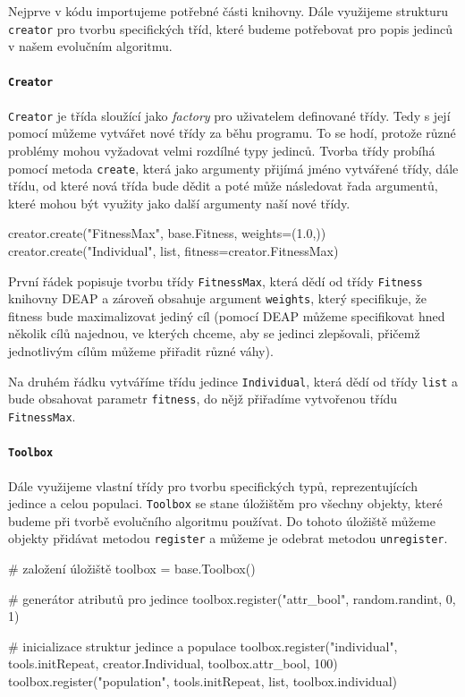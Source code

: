 Nejprve v kódu importujeme potřebné části knihovny. Dále využijeme strukturu
\texttt{creator} pro tvorbu specifických tříd, které budeme potřebovat pro
popis jedinců v našem evolučním algoritmu.

\paragraph{\texttt{Creator}} 
\texttt{Creator} je třída sloužící jako \emph{factory} pro uživatelem
definované třídy. Tedy s její pomocí můžeme vytvářet nové třídy za běhu
programu. To se hodí, protože různé problémy mohou vyžadovat velmi rozdílné
typy jedinců. Tvorba třídy probíhá pomocí metoda \texttt{create}, která jako
argumenty přijímá jméno vytvářené třídy, dále třídu, od které nová třída bude
dědit a poté může následovat řada argumentů, které mohou být využity jako další
argumenty naší nové třídy.

\begin{code}
creator.create("FitnessMax", base.Fitness, weights=(1.0,))
creator.create("Individual", list, fitness=creator.FitnessMax)
\end{code}

První řádek popisuje tvorbu třídy \texttt{FitnessMax}, která dědí od třídy
\texttt{Fitness} knihovny DEAP a zároveň obsahuje argument \texttt{weights},
který specifikuje, že fitness bude maximalizovat jediný cíl (pomocí DEAP můžeme
specifikovat hned několik cílů najednou, ve kterých chceme, aby se jedinci
zlepšovali, přičemž jednotlivým cílům můžeme přiřadit různé váhy).

Na druhém řádku vytváříme třídu jedince \texttt{Individual}, která dědí od
třídy \texttt{list} a bude obsahovat parametr \texttt{fitness}, do nějž
přiřadíme vytvořenou třídu \texttt{FitnessMax}.

\paragraph{\texttt{Toolbox}}
Dále využijeme vlastní třídy pro tvorbu specifických typů, reprezentujících
jedince a celou populaci. \texttt{Toolbox} se stane úložištěm pro všechny
objekty, které budeme při tvorbě evolučního algoritmu používat. Do tohoto
úložiště můžeme objekty přidávat metodou \texttt{register} a můžeme je odebrat
metodou \texttt{unregister}.

\pagebreak
\begin{code}
# založení úložiště 
toolbox = base.Toolbox()

# generátor atributů pro jedince
toolbox.register("attr_bool", random.randint, 0, 1)

# inicializace struktur jedince a populace
toolbox.register("individual", 
                 tools.initRepeat, 
                 creator.Individual, 
                 toolbox.attr_bool, 
                 100)
toolbox.register("population", 
                 tools.initRepeat, 
                 list, 
                 toolbox.individual)
\end{code}

